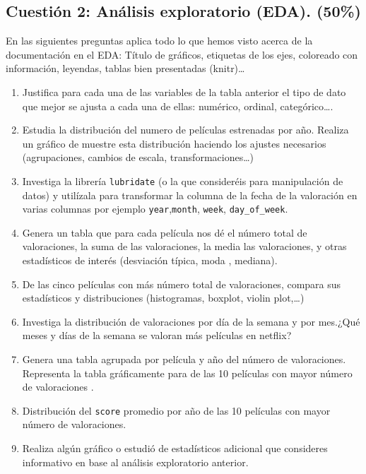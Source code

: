 \documentclass[
]{article}
\providecommand{\tightlist}{%
  \setlength{\itemsep}{0pt}\setlength{\parskip}{0pt}}
\begin{document}
\hypertarget{cuestiuxf3n-2-anuxe1lisis-exploratorio-eda.-50}{%
\subsection{Cuestión 2: Análisis exploratorio (EDA).
(50\%)}\label{cuestiuxf3n-2-anuxe1lisis-exploratorio-eda.-50}}

En las siguientes preguntas aplica todo lo que hemos visto acerca de la
documentación en el EDA: Título de gráficos, etiquetas de los ejes,
coloreado con información, leyendas, tablas bien presentadas
(knitr)\ldots{}

\begin{enumerate}
\def\labelenumi{\arabic{enumi}.}
\tightlist
\item
  Justifica para cada una de las variables de la tabla anterior el tipo
  de dato que mejor se ajusta a cada una de ellas: numérico, ordinal,
  categórico\ldots.
\item
  Estudia la distribución del numero de películas estrenadas por año.
  Realiza un gráfico de muestre esta distribución haciendo los ajustes
  necesarios (agrupaciones, cambios de escala, transformaciones\ldots)
\item
  Investiga la librería \texttt{lubridate} (o la que consideréis para
  manipulación de datos) y utilízala para transformar la columna de la
  fecha de la valoración en varias columnas por ejemplo
  \texttt{year},\texttt{month}, \texttt{week}, \texttt{day\_of\_week}.
\item
  Genera un tabla que para cada película nos dé el número total de
  valoraciones, la suma de las valoraciones, la media las valoraciones,
  y otras estadísticos de interés (desviación típica, moda , mediana).
\item
  De las cinco películas con más número total de valoraciones, compara
  sus estadísticos y distribuciones (histogramas, boxplot, violin
  plot,\ldots)
\item
  Investiga la distribución de valoraciones por día de la semana y por
  mes.¿Qué meses y días de la semana se valoran más películas en
  netflix?
\item
  Genera una tabla agrupada por película y año del número de
  valoraciones. Representa la tabla gráficamente para de las 10
  películas con mayor número de valoraciones .
\item
  Distribución del \texttt{score} promedio por año de las 10 películas
  con mayor número de valoraciones.
\item
  Realiza algún gráfico o estudió de estadísticos adicional que
  consideres informativo en base al análisis exploratorio anterior.
\end{enumerate}
\end{document}
